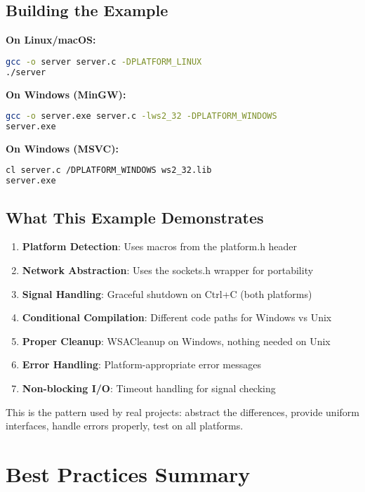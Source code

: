\subsection{Building the Example}

\textbf{On Linux/macOS:}
\begin{lstlisting}[language=bash]
gcc -o server server.c -DPLATFORM_LINUX
./server
\end{lstlisting}

\textbf{On Windows (MinGW):}
\begin{lstlisting}[language=bash]
gcc -o server.exe server.c -lws2_32 -DPLATFORM_WINDOWS
server.exe
\end{lstlisting}

\textbf{On Windows (MSVC):}
\begin{lstlisting}[language=bash]
cl server.c /DPLATFORM_WINDOWS ws2_32.lib
server.exe
\end{lstlisting}

\subsection{What This Example Demonstrates}

\begin{enumerate}
    \item \textbf{Platform Detection}: Uses macros from the platform.h header
    \item \textbf{Network Abstraction}: Uses the sockets.h wrapper for portability
    \item \textbf{Signal Handling}: Graceful shutdown on Ctrl+C (both platforms)
    \item \textbf{Conditional Compilation}: Different code paths for Windows vs Unix
    \item \textbf{Proper Cleanup}: WSACleanup on Windows, nothing needed on Unix
    \item \textbf{Error Handling}: Platform-appropriate error messages
    \item \textbf{Non-blocking I/O}: Timeout handling for signal checking
\end{enumerate}

This is the pattern used by real projects: abstract the differences, provide uniform interfaces, handle errors properly, test on all platforms.

\section{Best Practices Summary}

